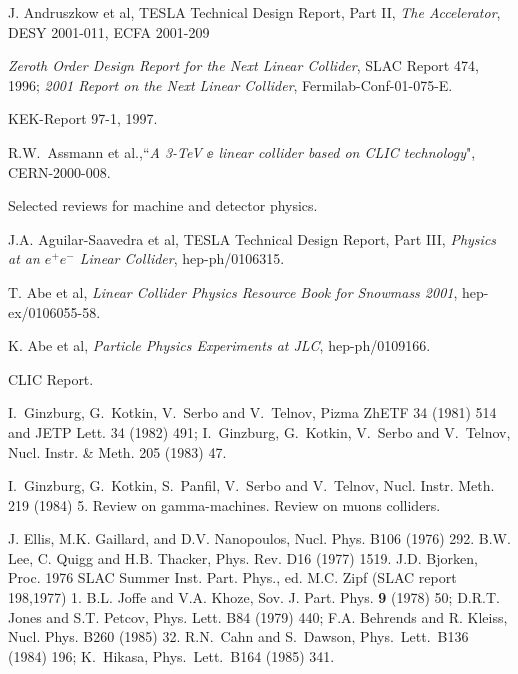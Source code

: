 


 J. Andruszkow et al, TESLA Technical Design Report, Part II,
{\it The Accelerator}, DESY 2001-011, ECFA 2001-209

 {\it Zeroth Order Design Report for the Next Linear Collider},
SLAC Report 474, 1996; {\it 2001 Report on the Next Linear Collider},
Fermilab-Conf-01-075-E. 

 KEK-Report 97-1, 1997.

 R.W.~Assmann et al.,``{\it A 3-TeV $\ee$  linear collider 
based on CLIC technology}", CERN-2000-008.

 Selected reviews for machine and detector physics. 

 J.A. Aguilar-Saavedra et al, TESLA Technical Design Report, 
Part III, {\it Physics at an $e^+e^-$ Linear Collider}, hep-ph/0106315.

 T. Abe et al, {\it Linear Collider Physics Resource Book for 
Snowmass 2001}, hep-ex/0106055-58.

 K. Abe et al, {\it Particle Physics Experiments at JLC},
hep-ph/0109166.

 CLIC Report. 

 I.~Ginzburg, G.~Kotkin, V.~Serbo and V.~Telnov, 
Pizma ZhETF 34 (1981) 514 and JETP Lett. 34 (1982) 491;
I.~Ginzburg, G.~Kotkin, V.~Serbo and V.~Telnov, Nucl.  Instr. \& Meth. 
205 (1983) 47.

 I.~Ginzburg, G.~Kotkin, S.~Panfil, V.~Serbo and 
V.~Telnov, Nucl. Instr. Meth. 219 (1984) 5.
%
 Review on gamma-machines. 
%
 Review on muons colliders. 

J. Ellis, M.K. Gaillard, and D.V. Nanopoulos, Nucl. Phys.  B106 (1976) 292.
%
B.W. Lee, C. Quigg and H.B. Thacker, Phys. Rev. D16 (1977) 1519.
%
J.D. Bjorken, Proc. 1976 SLAC Summer Inst. Part. 
Phys., ed. M.C. Zipf (SLAC report 198,1977) 1. 
%
B.L. Joffe and V.A. Khoze, Sov. J. Part. Phys. {\bf 9} (1978) 50; 
D.R.T. Jones and S.T. Petcov, Phys. Lett. B84 (1979) 440; 
F.A. Behrends and R. Kleiss, Nucl. Phys. B260 (1985) 32.
%
R.N.\ Cahn and S.\ Dawson, Phys.\ Lett.\ B136 (1984) 196; 
K.\ Hikasa, Phys.\ Lett.\ B164 (1985) 341. 

